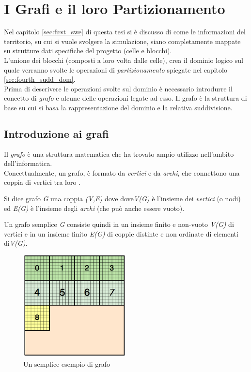 \section{I Grafi e il loro Partizionamento}
Nel capitolo \ref{sec:first_swe} di questa tesi si è discusso di come le informazioni del territorio, su cui si vuole svolgere la simulazione, siano completamente mappate su strutture dati specifiche del progetto (celle e blocchi).\\
L'unione dei blocchi (composti a loro volta dalle celle), crea il dominio logico sul quale verranno svolte le operazioni di \emph{partizionamento} spiegate nel capitolo \ref{sec:fourth_sudd_dom}.\\
Prima di descrivere le operazioni svolte sul dominio è necessario introdurre il concetto di \emph{grafo} e alcune delle operazioni legate ad esso. Il grafo è la struttura di base su cui si basa la rappresentazione del dominio e la relativa suddivisione.

\subsection{Introduzione ai grafi}
Il \emph{grafo} è una struttura matematica che ha trovato ampio utilizzo nell'ambito dell'informatica.\\
Concettualmente, un grafo, è formato da \emph{vertici} e da \emph{archi}, che connettono una coppia di vertici tra loro \cite{cormen}.
\begin{defn}
Si dice grafo \emph{G} una coppia \emph{(V,E)} dove dove\emph{V(G)} è l'insieme dei \emph{vertici} (o nodi) ed \emph{E(G)} è l'insieme degli \emph{archi} (che può anche essere vuoto).
\end{defn}
Un grafo semplice \emph{G} consiste quindi in un insieme finito e non-vuoto \textit{V(G)} di vertici e in un insieme finito \textit{E(G)} di coppie distinte e non ordinate di elementi di\textit{V(G)}.
\begin{figure}[H]
	\centering
	\includegraphics[width=0.5\textwidth]{immagini/block_on_grid.png}
	\caption{Un semplice esempio di grafo}
	\label{fig:simple_graph}
\end{figure}

